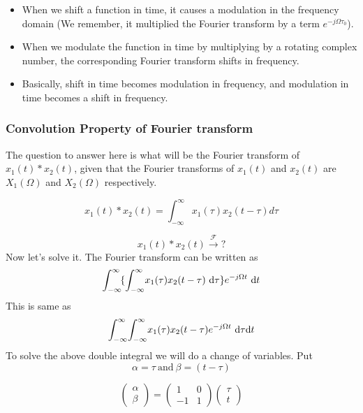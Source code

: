 		\begin{itemize}
			\item When we shift a function in time, it causes a modulation in the frequency domain (We remember, it multiplied the Fourier transform by a term $e^{-j\Omega \tau_0}$).

			\item When we modulate the function in time by multiplying by a rotating complex number, the corresponding Fourier transform shifts in frequency.

			\item Basically, shift in time becomes modulation in frequency, and modulation in time becomes a shift in frequency.
		\end{itemize}

	\subsubsection{Convolution Property of Fourier transform}
		The question to answer here is what will be the Fourier transform of $x_1(t)*x_2(t)$, given that the Fourier transforms of $x_1(t)$ and $x_2(t)$ are $X_1(\Omega)$ and $X_2(\Omega)$ respectively. 

		\begin{equation}
			x_1(t)\ast x_2(t) = \int_{-\infty}^{\infty}{x_1(\tau) x_2(t-\tau)}d\tau
		\end{equation}

		\begin{equation}
			x_1(t)\ast x_2(t) \xrightarrow{\mathcal{F}} {?}
		\end{equation}
		\noindent
		Now let's solve it. The Fourier transform can be written as
		\begin{equation}
			\int_{-\infty}^{\infty} \! \{ \int_{-\infty}^{\infty} \! x_1(\tau) x_2(t-\tau) \ \mathrm{d} \tau \} e^{-j\Omega t} \ \mathrm{d} t
		\end{equation}
		This is same as
		\begin{equation}
			\int_{-\infty}^{\infty} \! \int_{-\infty}^{\infty} \! x_1(\tau) x_2(t-\tau) e^{-j\Omega t} \ \mathrm{d} \tau \mathrm{d} t
		\end{equation}
		To solve the above double integral we will do a change of variables. Put
		\begin{equation}
			\alpha =\tau \ \text{and} \ \beta = (t-\tau)
		\end{equation}

		\begin{equation}
			\left( \begin{array}{c}
			\alpha \\
			\beta \end{array} \right)
			=
			\left( \begin{array}{cc}
			1 & 0 \\
			-1 & 1 \end{array} \right)
			\left( \begin{array}{c}
			\tau \\
			 t \end{array} \right)
		\end{equation}


